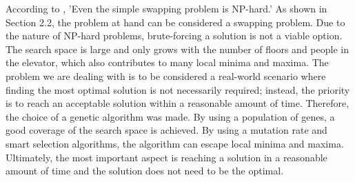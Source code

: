 According to \cite{anily1992swapping}, 'Even the simple swapping problem is NP-hard.' As shown in Section 2.2, the problem at hand can be considered a swapping problem. Due to the nature of NP-hard problems, brute-forcing a solution is not a viable option. The search space is large and only grows with the number of 
floors and people in the elevator, which also contributes to many local minima and maxima. The problem we are dealing with is to be considered a real-world
scenario where finding the most optimal solution is not necessarily required; instead, the priority is to reach an acceptable solution within a reasonable 
amount of time. Therefore, the choice of a genetic algorithm was made. By using a population of genes, a good coverage of the search space is achieved.
By using a mutation rate and smart selection algorithms, the algorithm can escape local minima and maxima. Ultimately,
the most important aspect is reaching a solution in a reasonable amount of time and the solution does not need to be the optimal.
